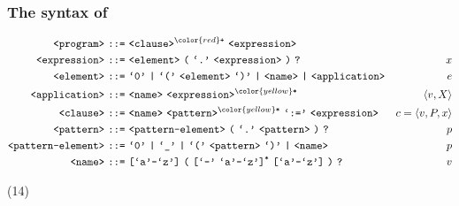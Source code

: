 \begin{frame}

\frametitle{The syntax of \D{}}

\setcounter{equation}{0}

\begin{align*}
\nonterm{program}\ \textt{::=}&\ \nonterm{clause}^{\color{red}\textt{+}}
\ \nonterm{expression}
& \\
\nonterm{expression}\ \textt{::=}&\ \nonterm{element}\ \textt{(}\ \term{.}
\ \nonterm{expression}\ \textt{)}\ \textt{?}
& x\\
\nonterm{element}\ \textt{::=}&\ \term{0}\ \textt{|}\ \term{(}
\ \nonterm{element}\ \term{)}\ \textt{|}\ \nonterm{name}\ \textt{|}
\ \nonterm{application}
& e\\
\nonterm{application}\ \textt{::=}&\ \nonterm{name}
\ \nonterm{expression}^{\color{yellow}\textt{*}}
& \left\langle v,X \right\rangle \\
\nonterm{clause}\ \textt{::=}&\ \nonterm{name}
\ \nonterm{pattern}^{\color{yellow}\textt{*}}\ \term{:=}
\ \nonterm{expression}
& c=\left\langle v, P, x \right\rangle \\
\nonterm{pattern}\ \textt{::=}&\ \nonterm{pattern-element}\ \textt{(}
\ \term{.}\ \nonterm{pattern}\ \textt{)}\ \textt{?}
& p\\
\nonterm{pattern-element}\ \textt{::=}&\ \term{0}\ \textt{|}\ \term{\_}
\ \textt{|}\ \term{(}\ \nonterm{pattern}\ \term{)}\ \textt{|}\ \nonterm{name}
& p\\
\nonterm{name}\ \textt{::=}&\ \textt{[}\term{a}\mathmono{-}\term{z}\textt{]}
\ \textt{(}\ \textt{[}\term{-}\ \term{a}\mathmono{-}\term{z}\textt{]}^\textt{*}
\ \textt{[}\term{a}\mathmono{-}\term{z}\textt{]}\ \textt{)}\ \textt{?}
& v
\end{align*}

(14)


\end{frame}
